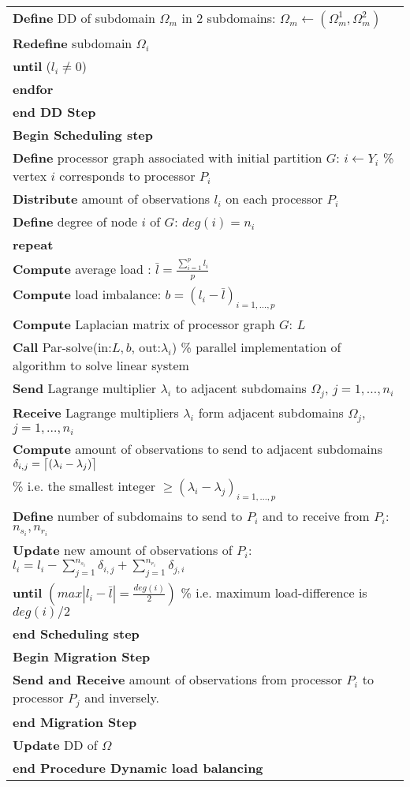 \documentclass[10pt]{article}
\DeclarePairedDelimiter{\ceil}{\lceil}{\rceil}
\begin{document}
\begin{table}[ht!]
\begin{tabular}{l}
\textbf{Define} DD of subdomain $\Omega_m$ in 2 subdomains: $\Omega_m\leftarrow (\Omega_m^{1},\Omega_m^{2})$  \\
\textbf{Redefine} subdomain $\Omega_i$\\
\textbf{until} ($l_i\neq 0$)\\
\textbf{endfor}\\
\textbf{end DD Step}\\
\textbf{Begin Scheduling step}\\
\textbf{Define} processor graph associated with initial partition $G$: $i\leftarrow Y_i$ \% vertex $i$ corresponds to processor $P_i$\\
\textbf{Distribute} amount of observations $l_i$ on each processor $P_i$\\
\textbf{Define} degree of node $i$ of $G$: $deg(i)=n_i$ \\
\textbf{repeat}\\
\textbf{Compute} average load : $\bar{l}=\frac{\sum_{i=1}^{p}l_i}{p}$\\
\textbf{Compute} load imbalance: $b={(l_i-\bar{l})_{i=1,\ldots,p}}$\\
\textbf{Compute} Laplacian matrix of processor graph $G$: $L$\\
\textbf{Call} Par-solve(in:$L,b$, out:$\lambda_i$) \% parallel implementation of algorithm to solve linear system\\
\textbf{Send} Lagrange multiplier $\lambda_i$ to adjacent subdomains $\Omega_j$, $j=1,\ldots,n_i$\\
\textbf{Receive} Lagrange multipliers $\lambda_i$ form adjacent subdomains $\Omega_j$, $j=1,\ldots,n_i$\\
\textbf{Compute} amount of observations to send to adjacent subdomains $\delta_{i,j}=\ceil[\big]{(\lambda_i-\lambda_j)}$\\ \% i.e. the smallest integer $\ge (\lambda_i-\lambda_j)_{i=1,\ldots,p}$\\
\textbf{Define} number of subdomains to send to $P_i$ and to receive from $P_i$: $n_{s_i},n_{r_i}$\\ 
\textbf{Update} new amount of observations of $P_i$:  $l_i=l_i-\sum_{j=1}^{n_{s_i}}\delta_{i,j}+\sum_{j=1}^{n_{r_i}}\delta_{j,i}$\\
\textbf{until} $(max |l_i-\bar{l}|=\frac{deg(i)}{2})$ \% i.e. maximum load-difference is $deg(i)/2$\\
\textbf{end Scheduling step}\\
\textbf{Begin Migration Step}\\
\textbf{Send and Receive} amount of observations from processor $P_i$ to processor $P_j$ and inversely.\\
\textbf{end Migration Step}\\
\textbf{Update} DD of $\Omega$\\
\textbf{end Procedure  Dynamic load balancing}\\
\hline
\end{tabular}
\end{table}


\end{document}
